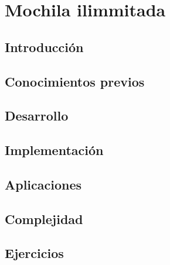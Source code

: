 \chapter{Mochila ilimmitada}
\section{Introducción}

\section{Conocimientos previos}

\section{Desarrollo}

\section{Implementación}

\section{Aplicaciones}

\section{Complejidad}

\section{Ejercicios}

